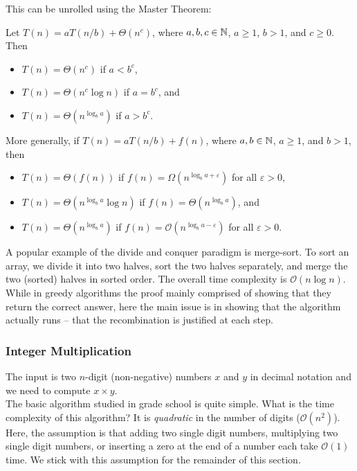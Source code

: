 This can be unrolled using the Master Theorem:

\begin{theorem}
	Let $T(n)=a T(n/b) + \Theta(n^c)$, where $a,b,c\in\mathbb{N}$, $a\geq 1$, $b>1$, and $c\geq 0$. Then
	\begin{itemize}
		\item $T(n)=\Theta(n^c)$ if $a<b^c$,
		\item $T(n)=\Theta(n^c\log n)$ if $a=b^c$, and
		\item $T(n)=\Theta(n^{\log_b a})$ if $a>b^c$.
	\end{itemize}
	More generally, if $T(n)=a T(n/b) + f(n)$, where $a,b\in\mathbb{N}$, $a\geq 1$, and $b>1$, then
	\begin{itemize}
		\item $T(n)=\Theta(f(n))$ if $f(n) = \Omega(n^{\log_b a + \varepsilon})$ for all $\varepsilon>0$,
		\item $T(n)=\Theta(n^{\log_b a}\log n)$ if $f(n) = \Theta(n^{\log_b a})$, and
		\item $T(n)=\Theta(n^{\log_b a})$ if $f(n) = \mathcal{O}(n^{\log_b a - \varepsilon})$ for all $\varepsilon>0$.
	\end{itemize}
\end{theorem}

A popular example of the divide and conquer paradigm is merge-sort. To sort an array, we divide it into two halves, sort the two halves separately, and merge the two (sorted) halves in sorted order. The overall time complexity is $\mathcal{O}(n\log n)$. \\

While in greedy algorithms the proof mainly comprised of showing that they return the correct answer, here the main issue is in showing that the algorithm actually runs -- that the recombination is justified at each step.

\subsubsection{Integer Multiplication}

The input is two $n$-digit (non-negative) numbers $x$ and $y$ in decimal notation and we need to compute $x\times y$.\\

The basic algorithm studied in grade school is quite simple. What is the time complexity of this algorithm? It is \textit{quadratic} in the number of digits ($\mathcal{O}(n^2)$). Here, the assumption is that adding two single digit numbers, multiplying two single digit numbers, or inserting a zero at the end of a number each take $\mathcal{O}(1)$ time. We stick with this assumption for the remainder of this section.\\

